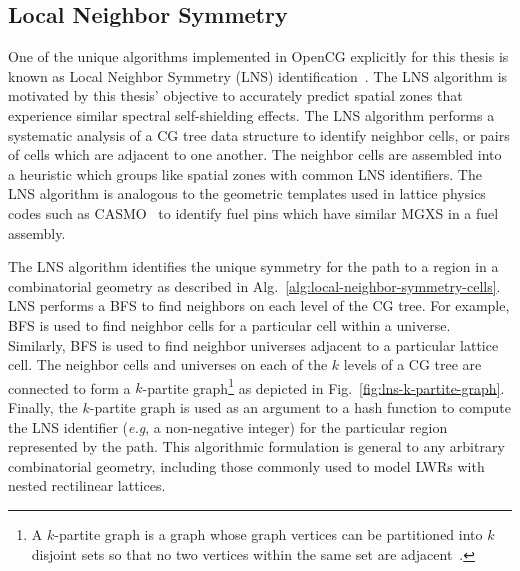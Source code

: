 \subsection{Local Neighbor Symmetry}
\label{sec:chap4-lns}

One of the unique algorithms implemented in OpenCG explicitly for this thesis is known as Local Neighbor Symmetry (LNS) identification~\cite{boyd2015opencg}. The LNS algorithm is motivated by this thesis' objective to accurately predict spatial zones that experience similar spectral self-shielding effects. The \ac{LNS} algorithm performs a systematic analysis of a \ac{CG} tree data structure to identify neighbor cells, or pairs of cells which are adjacent to one another. The neighbor cells are assembled into a heuristic which groups like spatial zones with common \ac{LNS} identifiers. The \ac{LNS} algorithm is analogous to the geometric templates used in lattice physics codes such as CASMO~\cite{edenius1995casmo} to identify fuel pins which have similar \ac{MGXS} in a fuel assembly.

The \ac{LNS} algorithm identifies the unique symmetry for the path to a region in a combinatorial geometry as described in Alg.~\ref{alg:local-neighbor-symmetry-cells}. \ac{LNS} performs a \ac{BFS} to find neighbors on each level of the \ac{CG} tree. For example, \ac{BFS} is used to find neighbor cells for a particular cell within a universe. Similarly, \ac{BFS} is used to find neighbor universes adjacent to a particular lattice cell. The neighbor cells and universes on each of the $k$ levels of a \ac{CG} tree are connected to form a $k$-partite graph\footnote{A $k$-partite graph is a graph whose graph vertices can be partitioned into $k$ disjoint sets so that no two vertices within the same set are adjacent~\cite{weisstein2012kpartite}.} as depicted in Fig.~\ref{fig:lns-k-partite-graph}. Finally, the $k$-partite graph is used as an argument to a hash function to compute the \ac{LNS} identifier (\textit{e.g}, a non-negative integer) for the particular region represented by the path. This algorithmic formulation is general to any arbitrary combinatorial geometry, including those commonly used to model \ac{LWR}s with nested rectilinear lattices.

